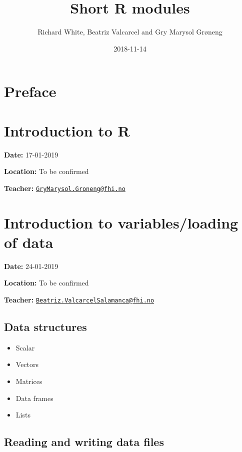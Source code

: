 \documentclass[12pt,]{article}
\title{Short R modules}
\author{Richard White, Beatriz Valcarcel and Gry Marysol Grøneng}
\date{2018-11-14}
\providecommand{\tightlist}{%
  \setlength{\itemsep}{0pt}\setlength{\parskip}{0pt}}
\begin{document}
\maketitle

{
\hypersetup{linkcolor=black}
\setcounter{tocdepth}{2}
\tableofcontents
}
\listoftables
\listoffigures
\section*{Preface}\label{preface}

\section{Introduction to R}\label{introduction-to-r}

\textbf{Date:} 17-01-2019

\textbf{Location:} To be confirmed

\textbf{Teacher:}
\href{mailto:GryMarysol.Groneng@fhi.no}{\nolinkurl{GryMarysol.Groneng@fhi.no}}

\section{Introduction to variables/loading of
data}\label{introduction-to-variablesloading-of-data}

\textbf{Date:} 24-01-2019

\textbf{Location:} To be confirmed

\textbf{Teacher:}
\href{mailto:Beatriz.ValcarcelSalamanca@fhi.no}{\nolinkurl{Beatriz.ValcarcelSalamanca@fhi.no}}

\subsection{Data structures}\label{data-structures}

\begin{itemize}
\tightlist
\item
  Scalar
\item
  Vectors
\item
  Matrices
\item
  Data frames
\item
  Lists
\end{itemize}

\subsection{Reading and writing data
files}\label{reading-and-writing-data-files}
\end{document}
